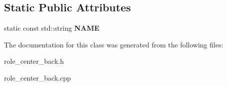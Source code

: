 \subsection*{Static Public Attributes}
\begin{DoxyCompactItemize}
\item 
\hypertarget{classRoleCenterBack_a0a34fc9e0553ef3e61610b6b60297b1d}{
static const std::string {\bfseries NAME}}
\label{classRoleCenterBack_a0a34fc9e0553ef3e61610b6b60297b1d}

\end{DoxyCompactItemize}


The documentation for this class was generated from the following files:\begin{DoxyCompactItemize}
\item 
role\_\-center\_\-back.h\item 
role\_\-center\_\-back.cpp\end{DoxyCompactItemize}
